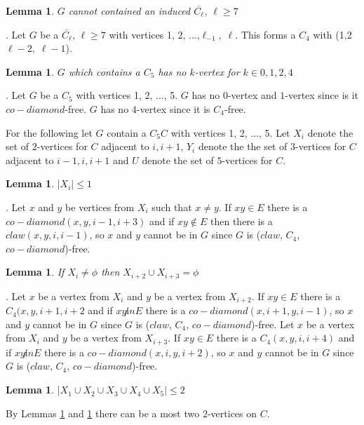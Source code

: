 \documentclass[12pt]{article}
\newtheorem{Lemma}[Theorem]{Lemma}
\def\CCD{($claw$, $C_4$, $co-diamond$)}
\begin{document}
\begin{Lemma}\label{lem:anti-odd-hole-free}
$G$ cannot contained an induced $\overline{C_\ell}$, $\ell \geq 7$
\end{Lemma}
. Let $G$ be a $\overline{C_\ell}$, $\ell \geq 7$ with vertices 1, 2, ...,$\ell_{-1},\; \ell$. This forms a $C_4$ with (1,2 $\ell-2,\; \ell-1$).

\begin{Lemma}\label{lem:c5-k-vertex}
$G$ which contains a $C_5$ has no $k$-vertex for $k \in {0, 1, 2, 4}$
\end{Lemma}
. Let $G$ be a $C_5$ with vertices 1, 2, ..., 5. $G$ has no $0$-vertex and $1$-vertex since is it $co-diamond$-free. $G$ has no $4$-vertex since it is $C_4$-free.

For the following let $G$ contain a $C_5 C$ with vertices 1, 2, ..., 5. Let $X_i$ denote the set of $2$-vertices for $C$ adjacent to $i, i+1$, $Y_i$ denote the the set of $3$-vertices for $C$ adjacent to $i-1, i, i+1$ and $U$ denote the set of $5$-vertices for $C$.

\begin{Lemma}\label{lem:max-2-xi}
$|X_i| \leq 1$
\end{Lemma}
. Let $x$ and $y$ be vertices from $X_i$ such that $x \neq y$. If $xy \in E$ there is a $co-diamond (x, y, i-1, i+3)$ and if $xy \not \in E$ then there is a $claw (x, y, i, i-1)$, so $x$ and $y$ cannot be in $G$ since $G$ is {\CCD}-free.

\begin{Lemma}\label{lem:xi-no-xi2}
If $X_i \neq \phi$ then $X_{i+2} \cup X_{i+3} = \phi$
\end{Lemma}
. Let $x$ be a vertex from $X_i$ and $y$ be a vertex from $X_{i+2}$. If $xy \in E$ there is a $C_4 (x, y, i+1, i+2$ and if $xy \not in E$ there is a $co-diamond (x,i+1, y, i-1)$, so $x$ and $y$ cannot be in $G$ since $G$ is {\CCD}-free. Let $x$ be a vertex from $X_i$ and $y$ be a vertex from $X_{i+3}$. If $xy \in E$ there is a $C_4 (x, y, i, i+4)$ and if $xy \not in E$ there is a $co-diamond (x,i, y, i+2)$, so $x$ and $y$ cannot be in $G$ since $G$ is {\CCD}-free. 

\begin{Lemma}\label{lem:max-2-2K}
$|X_1 \cup X_2 \cup X_3 \cup X_4 \cup X_5| \leq 2$
\end{Lemma}
 By Lemmas \ref{lem:max-2-xi} and \ref{lem:max-2-2K} there can be a most two $2$-vertices on $C$.
\end{document}
